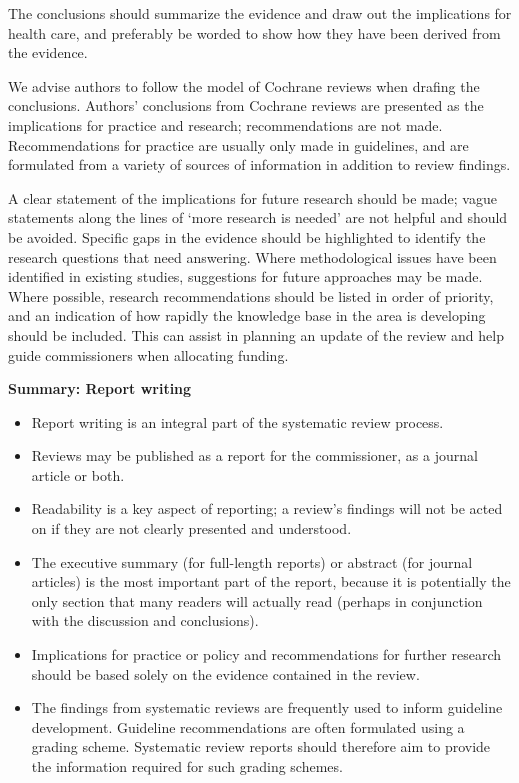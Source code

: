 \documentclass[
  11pt,
  a4paper,
  DIV=11,
  numbers=noendperiod]{scrreprt}
\begin{document}
The conclusions should summarize the evidence and draw out the
implications for health care, and preferably be worded to show how they
have been derived from the evidence.

We advise authors to follow the model of Cochrane reviews when drafing
the conclusions. Authors' conclusions from Cochrane reviews are
presented as the implications for practice and research; recommendations
are not made. Recommendations for practice are usually only made in
guidelines, and are formulated from a variety of sources of information
in addition to review findings.

A clear statement of the implications for future research should be
made; vague statements along the lines of `more research is needed' are
not helpful and should be avoided. Specific gaps in the evidence should
be highlighted to identify the research questions that need answering.
Where methodological issues have been identified in existing studies,
suggestions for future approaches may be made. Where possible, research
recommendations should be listed in order of priority, and an indication
of how rapidly the knowledge base in the area is developing should be
included. This can assist in planning an update of the review and help
guide commissioners when allocating funding.

\textbf{Summary: Report writing}

\begin{itemize}
\item
  Report writing is an integral part of the systematic review process.
\item
  Reviews may be published as a report for the commissioner, as a
  journal article or both.
\item
  Readability is a key aspect of reporting; a review's findings will not
  be acted on if they are not clearly presented and understood.
\item
  The executive summary (for full-length reports) or abstract (for
  journal articles) is the most important part of the report, because it
  is potentially the only section that many readers will actually read
  (perhaps in conjunction with the discussion and conclusions).
\item
  Implications for practice or policy and recommendations for further
  research should be based solely on the evidence contained in the
  review.
\item
  The findings from systematic reviews are frequently used to inform
  guideline development. Guideline recommendations are often formulated
  using a grading scheme. Systematic review reports should therefore aim
  to provide the information required for such grading schemes.
\end{itemize}
\end{document}

